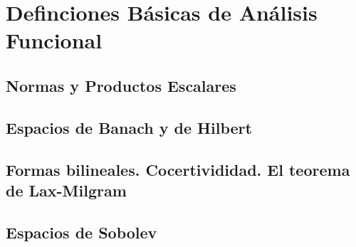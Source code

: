 \documentclass[11pt]{article}
\theoremstyle{plain}
\theoremstyle{definition}
\begin{document}
\section{Definciones Básicas de Análisis Funcional}
\label{sec:definiciones.basicas}

\subsection{Normas y Productos Escalares}

\subsection{Espacios de Banach y de Hilbert}

\subsection{Formas bilineales. Cocertivididad. El teorema de Lax-Milgram}

\subsection{Espacios de Sobolev}




\end{document}
